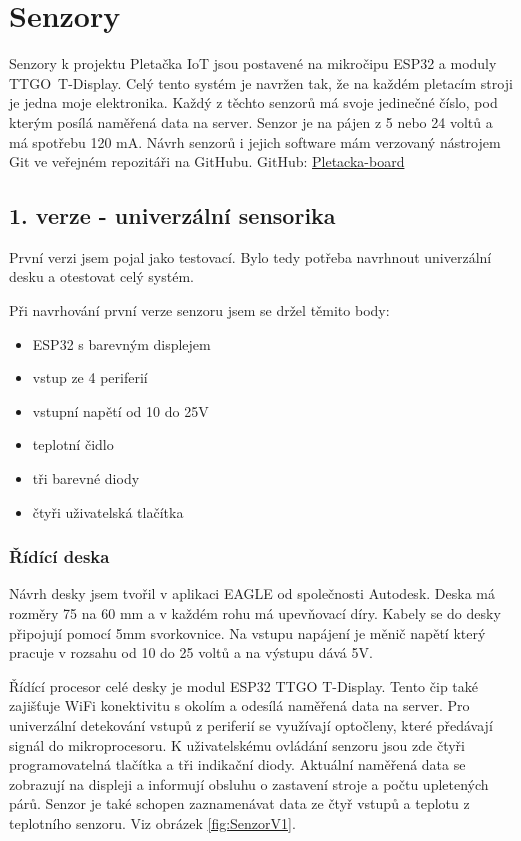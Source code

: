\chapter{Senzory}

Senzory k projektu Pletačka IoT jsou postavené na mikročipu ESP32 a moduly TTGO~T-Display.
Celý tento systém je navržen tak, že na každém pletacím stroji je jedna moje elektronika.
Každý z těchto senzorů má svoje jedinečné číslo, pod kterým posílá naměřená data na server.
Senzor je na pájen z 5 nebo 24 voltů a má spotřebu 120 mA.
Návrh senzorů i jejich software mám verzovaný nástrojem Git ve veřejném repozitáři na GitHubu.\newline
GitHub: \href{https://github.com/Pletacka-IoT/Pletacka-board}{Pletacka-board}\cite{PL_BOARD}

\section{1. verze - univerzální sensorika}

První verzi jsem pojal jako testovací. Bylo tedy potřeba navrhnout univerzální desku a otestovat celý systém.\newline

Při navrhování první verze senzoru jsem se držel těmito body:
\begin{itemize}
    \item ESP32 s barevným displejem
    \item vstup ze 4 periferií
    \item vstupní napětí od 10 do 25V
    \item teplotní čidlo
    \item tři barevné diody
    \item čtyři uživatelská tlačítka
\end{itemize}


\subsection{Řídící deska}
Návrh desky jsem tvořil v aplikaci EAGLE od společnosti Autodesk. 
Deska má rozměry 75 na 60 mm a v každém rohu má upevňovací díry. 
Kabely se do desky připojují pomocí 5mm svorkovnice.
Na vstupu napájení je měnič napětí který pracuje v rozsahu od 10 do 25 voltů a na výstupu dává 5V. 

Řídící procesor celé desky je modul ESP32 TTGO T-Display.
Tento čip také zajišťuje WiFi konektivitu s okolím a odesílá naměřená data na server.
Pro univerzální detekování vstupů z periferií se využívají optočleny, které předávají signál do mikroprocesoru.
K uživatelskému ovládání senzoru jsou zde čtyři programovatelná tlačítka a tři indikační diody.
Aktuální naměřená data se zobrazují na displeji a informují obsluhu o zastavení stroje a počtu upletených párů.
Senzor je také schopen zaznamenávat data ze čtyř vstupů a teplotu z teplotního senzoru. Viz obrázek \ref{fig:SenzorV1}.


